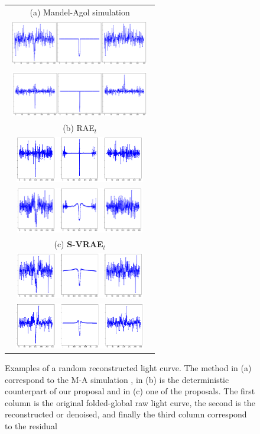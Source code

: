 \begin{figure}[!t]
    \centering
    \begin{tabular}{c}
         (a) Mandel-Agol simulation \\ 
         \includegraphics[width=0.95\textwidth, height=2cm]{imgs/MA_1.png} \\
         \includegraphics[width=0.95\textwidth, height=2cm]{imgs/MA_2.png} \\
        (b) RAE$_t$ \\
         \includegraphics[width=0.95\textwidth, height=2cm]{imgs/RAE_1.png}  \\
         \includegraphics[width=0.95\textwidth, height=2cm]{imgs/RAE_2.png}  \\
        (c) \textbf{S-VRAE$_t$} \\ 
         \includegraphics[width=0.95\textwidth, height=2cm]{imgs/S-VRAE_1.png} \\
         \includegraphics[width=0.95\textwidth, height=2cm]{imgs/S-VRAE_2.png} \\
    \end{tabular}
    \caption{Examples of a random reconstructed light curve. The method in (a) correspond to the M-A simulation \citep{mandel2002analytic}, in (b) is the deterministic counterpart of our proposal \citep{naul2018recurrent} and in (c) one of the proposals. The first column is the original folded-global raw light curve, the second is the reconstructed or denoised, and finally the third column correspond to the residual}
    \label{fig:denois_ex}
\end{figure}
